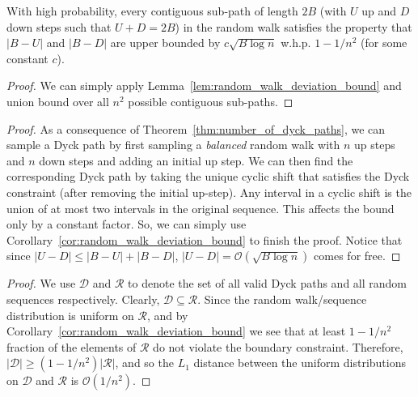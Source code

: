 \begin{corollary}
\label{cor:random_walk_deviation_bound}
With high probability, every contiguous sub-path of length $2B$ (with $U$ up and $D$ down steps such that $U+D=2B$) in the random walk
satisfies the property that $|B-U|$ and $|B-D|$ are upper bounded by $c\sqrt{B\log n}$ w.h.p. $1-1/n^2$ (for some constant $c$).
\end{corollary}
\begin{proof}
We can simply apply Lemma~\ref{lem:random_walk_deviation_bound} and union bound over all $n^2$ possible contiguous sub-paths.
\end{proof}

\DyckPathDeviationBound*
\begin{proof}
As a consequence of Theorem~\ref{thm:number_of_dyck_paths}, we can sample a Dyck path
by first sampling a \emph{balanced} random walk with $n$ up steps and $n$ down steps and adding an initial up step.
We can then find the corresponding Dyck path by taking the unique cyclic shift that satisfies the Dyck constraint (after removing the initial up-step).
Any interval in a cyclic shift is the union of at most two intervals in the original sequence.
This affects the bound only by a constant factor.
So, we can simply use Corollary~\ref{cor:random_walk_deviation_bound} to finish the proof.
Notice that since $|U-D| \le |B-U|+|B-D|$, $|U-D| = \mathcal O(\sqrt{B\log n})$ comes for free.
\end{proof}

\DyckPathIrrelevantBoundary*
\begin{proof}
We use $\mathcal D$ and $\mathcal R$ to denote the set of all valid Dyck paths and all random sequences respectively.
Clearly, $\mathcal D\subseteq \mathcal R$.
Since the random walk/sequence distribution is uniform on $\mathcal R$, and by Corollary~\ref{cor:random_walk_deviation_bound}
we see that at least $1-1/n^2$ fraction of the elements of $\mathcal R$ do not violate the boundary constraint.
Therefore, $|\mathcal D|\ge (1-1/n^2)|\mathcal R|$,
and so the $L_1$ distance between the uniform distributions on $\mathcal D$ and $\mathcal R$ is $\mathcal O(1/n^2)$.
\end{proof}



